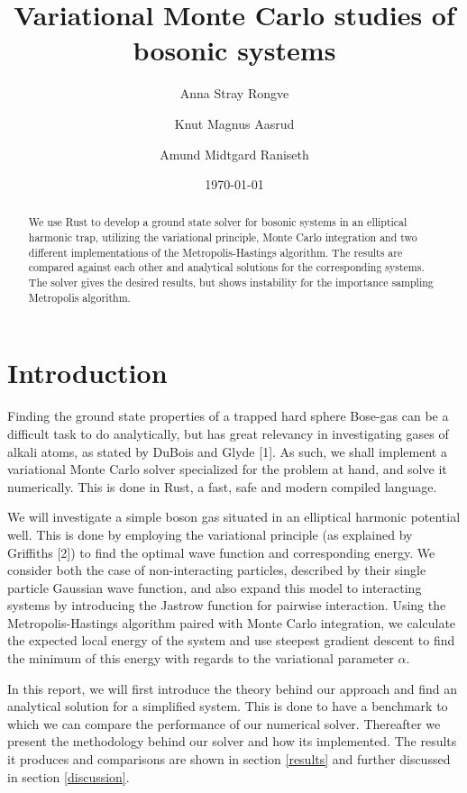 \documentclass[
]{article}
\title{Variational Monte Carlo studies of bosonic systems}
\author{Anna Stray Rongve \and Knut Magnus Aasrud \and Amund Midtgard
Raniseth}
\date{\today}
\begin{document}
\maketitle

\begin{abstract}
We use Rust to develop a ground state solver for bosonic systems in an elliptical harmonic trap, utilizing the variational principle, Monte Carlo integration and two different implementations of the Metropolis-Hastings algorithm. The results are compared against each other and analytical solutions for the corresponding systems. The solver gives the desired results, but shows instability for the importance sampling Metropolis algorithm.
\end{abstract}

\hypertarget{introduction}{%
\section{Introduction}\label{introduction}}

Finding the ground state properties of a trapped hard sphere Bose-gas
can be a difficult task to do analytically, but has great relevancy in
investigating gases of alkali atoms, as stated by DuBois and Glyde
{[}1{]}. As such, we shall implement a variational Monte Carlo solver
specialized for the problem at hand, and solve it numerically. This is
done in Rust, a fast, safe and modern compiled language.

We will investigate a simple boson gas situated in an elliptical
harmonic potential well. This is done by employing the variational
principle (as explained by Griffiths {[}2{]}) to find the optimal wave
function and corresponding energy. We consider both the case of
non-interacting particles, described by their single particle Gaussian
wave function, and also expand this model to interacting systems by
introducing the Jastrow function for pairwise interaction. Using the
Metropolis-Hastings algorithm paired with Monte Carlo integration, we
calculate the expected local energy of the system and use steepest
gradient descent to find the minimum of this energy with regards to the
variational parameter \(\alpha\).

In this report, we will first introduce the theory behind our approach
and find an analytical solution for a simplified system. This is done to
have a benchmark to which we can compare the performance of our
numerical solver. Thereafter we present the methodology behind our
solver and how its implemented. The results it produces and comparisons
are shown in section \ref{results} and further discussed in section
\ref{discussion}.
\end{document}
